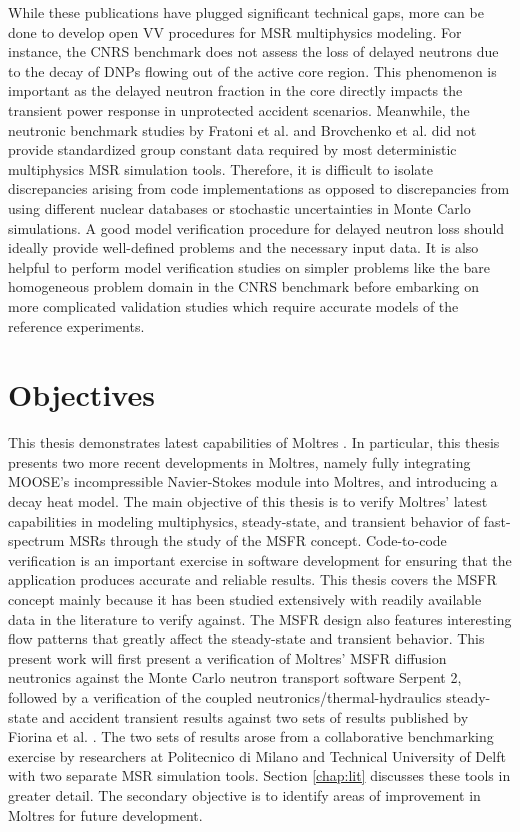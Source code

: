 While these publications have plugged significant technical gaps, more can be done to develop
open \gls{VV} procedures for \gls{MSR} multiphysics modeling. For instance, the
CNRS benchmark does not assess the loss of delayed neutrons due to the decay of \glspl{DNP} flowing
out of the active core region. This phenomenon is important as the delayed neutron fraction in the
core directly impacts the transient power response in unprotected accident scenarios. Meanwhile,
the neutronic benchmark studies by Fratoni et al. \cite{fratoni_molten_2020} and Brovchenko et al.
\cite{brovchenko_neutronic_2019} did not provide standardized group constant data required by most
deterministic multiphysics \gls{MSR} simulation tools. Therefore, it is difficult to isolate
discrepancies arising from code implementations as opposed to discrepancies from using different
nuclear databases or stochastic uncertainties in Monte Carlo simulations. A good model verification
procedure for delayed neutron loss should ideally provide well-defined problems and the necessary
input data. It is also helpful to perform model verification studies on simpler problems like the
bare homogeneous problem domain in the CNRS benchmark before embarking on more complicated
validation studies which require accurate models of the reference experiments.

\section{Objectives}

This thesis demonstrates latest capabilities of Moltres
\cite{lindsay_introduction_2018}.
In particular, this thesis presents two more recent
developments in Moltres, namely fully integrating \gls{MOOSE}'s incompressible
Navier-Stokes module into Moltres, and introducing a
decay heat model.
The main objective of this thesis is to verify Moltres'
latest capabilities in modeling multiphysics, steady-state, and transient
behavior of fast-spectrum \glspl{MSR} through the study of the \gls{MSFR}
concept. Code-to-code verification is an important exercise in software
development for ensuring that the application produces accurate and reliable
results. This thesis covers the \gls{MSFR} concept mainly because it has been
studied extensively with readily available data in the literature to verify
against. The \gls{MSFR} design also features interesting flow
patterns that greatly affect the steady-state and transient behavior. This
present work will first present a verification of Moltres' \gls{MSFR}
diffusion neutronics against the Monte Carlo neutron transport software
Serpent 2, followed by a verification of
the coupled neutronics/thermal-hydraulics steady-state and accident transient
results against two sets of results published by
Fiorina et al. \cite{fiorina_modelling_2014}. The two sets of results arose
from a collaborative benchmarking exercise by researchers at Politecnico di
Milano and Technical University of Delft with two separate \gls{MSR}
simulation tools. Section \ref{chap:lit} discusses these tools
in greater detail. The
secondary objective is to identify areas of improvement in Moltres for future
development.

